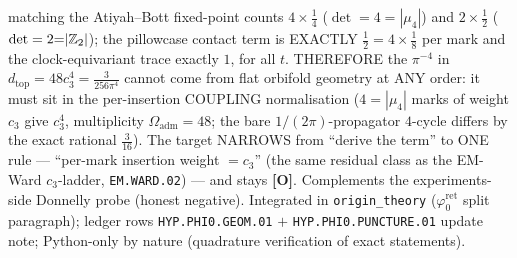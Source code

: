\documentclass[11pt]{article}
\providecommand{\mO}{\textbf{[O]}}\providecommand{\mX}{\textbf{[X]}}
\providecommand{\cthree}{c_3}\providecommand{\phiz}{\varphi_0^{\mathrm{ret}}}
\providecommand{\Oadm}{\Omega_{\mathrm{adm}}}\providecommand{\ainv}{\alpha^{-1}}
\begin{document}
\begin{itemize}[leftmargin=1.5em]
matching the Atiyah--Bott fixed-point counts $4{\times}\tfrac14$ ($\det=4{=}|\mu_4|$) and
$2{\times}\tfrac12$ ($\det=2{=}|\mathbb{Z}_2|$); the pillowcase contact term is EXACTLY $\tfrac12=4\times\tfrac18$
per mark and the clock-equivariant trace exactly $1$, for all $t$. THEREFORE the $\pi^{-4}$ in
$d_{\mathrm{top}}=48\cthree^4=\tfrac{3}{256\pi^4}$ cannot come from flat orbifold geometry at ANY order:
it must sit in the per-insertion COUPLING normalisation ($4{=}|\mu_4|$ marks of weight $\cthree$ give
$\cthree^4$, multiplicity $\Oadm{=}48$; the bare $1/(2\pi)$-propagator $4$-cycle differs by the exact
rational $\tfrac{3}{16}$). The target NARROWS from ``derive the term'' to ONE rule --- ``per-mark
insertion weight $=\cthree$'' (the same residual class as the EM-Ward $\cthree$-ladder,
\texttt{EM.WARD.02}) --- and stays \mO. Complements the experiments-side Donnelly probe (honest
negative). Integrated in \texttt{origin\_theory} ($\phiz$ split paragraph); ledger rows
\texttt{HYP.PHI0.GEOM.01} $+$ \texttt{HYP.PHI0.PUNCTURE.01} update note; Python-only by nature
(quadrature verification of exact statements).
\end{itemize}
\end{document}
